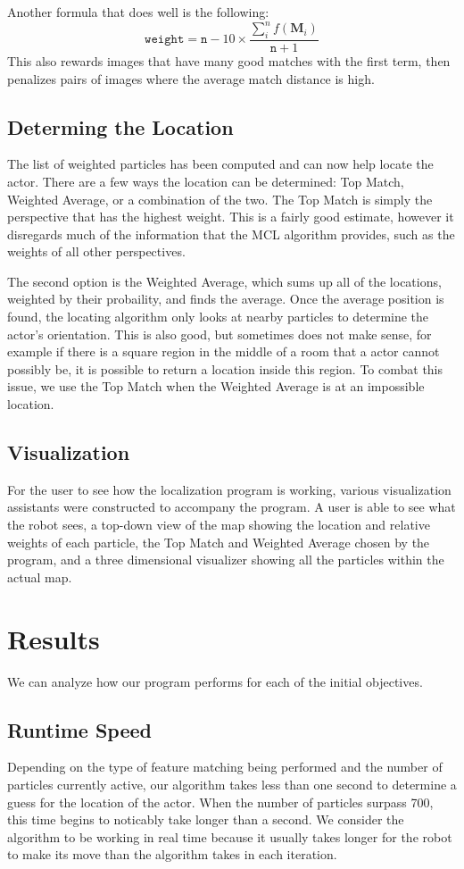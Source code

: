 \documentclass[a4paper,11pt]{article}
\begin{document}
Another formula that does well is the following:
\[
\mathtt{weight} = \mathtt{n} - 10 \times \frac{\sum_{i}^{n} f(\boldsymbol{M}_i)}{\mathtt{n} + 1}
\]
This also rewards images that have many good matches with the first term, then penalizes pairs of images where the average match distance is high.

\subsection{Determing the Location}
The list of weighted particles has been computed and can now help locate the actor. There are a few ways the location can be determined: Top Match, Weighted Average, or a combination of the two. The Top Match is simply the perspective that has the highest weight. This is a fairly good estimate, however it disregards much of the information that the MCL algorithm provides, such as the weights of all other perspectives. 

The second option is the Weighted Average, which sums up all of the locations, weighted by their probaility, and finds the average. Once the average position is found, the locating algorithm only looks at nearby particles to determine the actor's orientation. This is also good, but sometimes does not make sense, for example if there is a square region in the middle of a room that a actor cannot possibly be, it is possible to return a location inside this region. To combat this issue, we use the Top Match when the Weighted Average is at an impossible location.

\subsection{Visualization}
For the user to see how the localization program is working, various visualization assistants were constructed to accompany the program. A user is able to see what the robot sees, a top-down view of the map showing the location and relative weights of each particle, the Top Match and Weighted Average chosen by the program, and a three dimensional visualizer showing all the particles within the actual map.

\section{Results}
We can analyze how our program performs for each of the initial objectives.

\subsection{Runtime Speed}
Depending on the type of feature matching being performed and the number of particles currently active, our algorithm takes less than one second to determine a guess for the location of the actor. When the number of particles surpass 700, this time begins to noticably take longer than a second. We consider the algorithm to be working in real time because it usually takes longer for the robot to make its move than the algorithm takes in each iteration.
\end{document}
